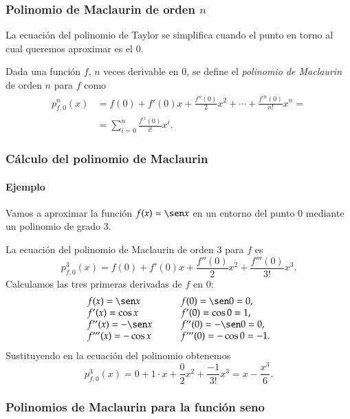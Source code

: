 \begin{frame}
	\frametitle{Polinomio de Maclaurin de orden $n$}
	La ecuación del polinomio de Taylor se simplifica cuando el punto en torno al cual queremos aproximar es el $0$.
	\begin{definicion}
		Dada una función $f$, $n$ veces derivable en $0$, se define el \emph{polinomio de Maclaurin} de orden $n$ para $f$ como
		\begin{align*}
			p_{f,0}^n(x) & =f(0)+f'(0)x+\frac{f''(0)}{2}x^2+\cdots +\frac{f^{(n}(0)}{n!}x^n = \\ &=\sum_{i=0}^{n}\frac{f^{(i}(0)}{i!}x^i.
		\end{align*}
	\end{definicion}
\end{frame}


\begin{frame}
	\frametitle{Cálculo del polinomio de Maclaurin}
	\framesubtitle{Ejemplo}
	Vamos a aproximar la función $f(x)=\sen x$ en un entorno del punto $0$ mediante un polinomio de grado $3$.
	
	La ecuación del polinomio de Maclaurin de orden $3$ para $f$ es
	\[
		p_{f,0}^3(x)=f(0)+f'(0)x+\frac{f''(0)}{2}x^2+\frac{f'''(0)}{3!}x^3.
	\]
	Calculamos las tres primeras derivadas de $f$ en $0$:
	\[
		\begin{array}{lll}
			f(x)=\sen x     & \quad & f(0)=\sen 0 =0,     \\
			f'(x)=\cos x    &       & f'(0)=\cos 0=1,     \\
			f''(x)=-\sen x  &       & f''(0)=-\sen 0=0,   \\
			f'''(x)=-\cos x &       & f'''(0)=-\cos 0=-1. 
		\end{array}
	\]
	Sustituyendo en la ecuación del polinomio obtenemos
	\[
		p_{f,0}^3(x)=0+1\cdot x+\frac{0}{2}x^2+\frac{-1}{3!}x^3= x-\frac{x^3}{6}.
	\]
\end{frame}


\begin{frame}
	\frametitle{Polinomios de Maclaurin para la función seno}
	\begin{center}
		\scalebox{1}{}
	\end{center}
\end{frame}


